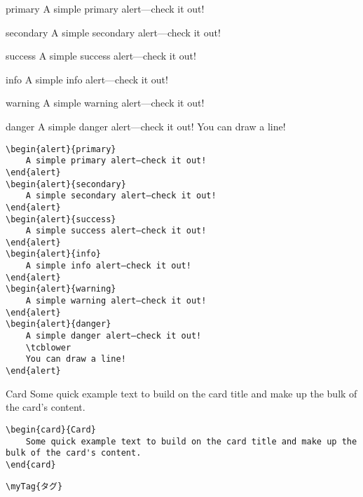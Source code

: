 \documentclass[dvipdfmx,uplatex,b5j,8pt,nomag*]{jsarticle}
\begin{document}
\newpage
\begin{multicols}{2}
\begin{alert}{primary}
A simple primary alert—check it out!
\end{alert}
\begin{alert}{secondary}
A simple secondary alert—check it out!
\end{alert}
\begin{alert}{success}
A simple success alert—check it out!
\end{alert}
\begin{alert}{info}
A simple info alert—check it out!
\end{alert}
\begin{alert}{warning}
A simple warning alert—check it out!
\end{alert}
\begin{alert}{danger}
A simple danger alert—check it out!
\tcblower
You can draw a line!
\end{alert}
\columnbreak
\begin{lstlisting}
\begin{alert}{primary}
    A simple primary alert—check it out!
\end{alert}
\begin{alert}{secondary}
    A simple secondary alert—check it out!
\end{alert}
\begin{alert}{success}
    A simple success alert—check it out!
\end{alert}
\begin{alert}{info}
    A simple info alert—check it out!
\end{alert}
\begin{alert}{warning}
    A simple warning alert—check it out!
\end{alert}
\begin{alert}{danger}
    A simple danger alert—check it out!
    \tcblower
    You can draw a line!
\end{alert}
\end{lstlisting}
\end{multicols}



\begin{multicols}{2}
\begin{card}{Card}
Some quick example text to build on the card title and make up the bulk of the card's content.
\end{card}
\columnbreak
\begin{lstlisting}
\begin{card}{Card}
    Some quick example text to build on the card title and make up the bulk of the card's content.
\end{card}
\end{lstlisting}
\end{multicols}

\begin{multicols}{2}
\columnbreak
\begin{lstlisting}
\myTag{タグ}
\end{lstlisting}
\end{multicols}
\end{document}
